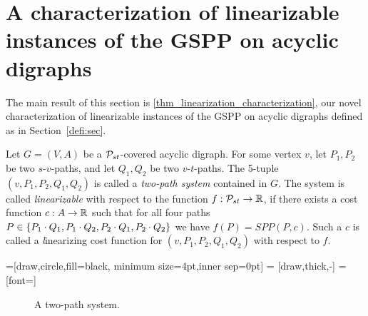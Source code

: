 \section{A characterization of linearizable instances of  the GSPP on acyclic digraphs}\label{charact:sec}
 The main result of this section is \cref{thm_linearization_characterization}, our novel characterization of  linearizable instances of the GSPP on acyclic digraphs defined as in Section~\ref{defi:sec}. 
\begin{definition}
Let $G=(V,A)$ be a $\mathcal{P}_{st}$-covered acyclic digraph. For some vertex $v$, let $P_1, P_2$ be two $s$-$v$-paths, and let $Q_1, Q_2$ be two $v$-$t$-paths. The 5-tuple $(v,P_1,P_2,Q_1,Q_2)$ is called a \emph{two-path system} contained in $G$. The system is called \emph{linearizable} with respect to the function $f : \mathcal{P}_{st} \rightarrow \mathbb{R}$, if there exists a cost function $c : A \rightarrow \mathbb{R}$ such that for all four paths $P \in \{ P_1 \cdot Q_1, P_1 \cdot Q_2, P_2 \cdot Q_1, P_2 \cdot Q_2 \}$ we have $f(P) = SPP(P,c)$. Such a $c$ is called  a {\emph linearizing cost function} for  $(v,P_1,P_2,Q_1,Q_2)$ with respect to $f$. 
\end{definition}

=[draw,circle,fill=black, minimum size=4pt,inner sep=0pt]
 = [draw,thick,-]
 = [font=\small]
\begin{figure}[bth]
\centering
{}
\caption{A two-path system.}
 \label{fig:two-path-system}
\end{figure}

